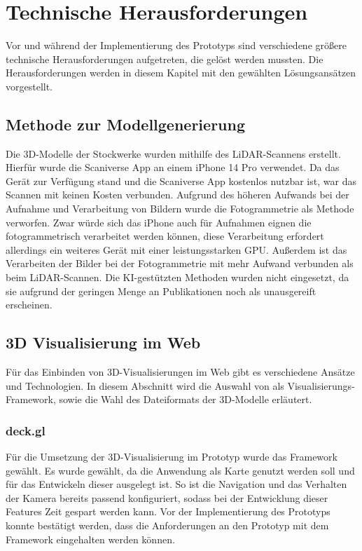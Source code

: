 \newpage
\section{Technische Herausforderungen}
Vor und während der Implementierung des Prototyps sind verschiedene größere technische Herausforderungen aufgetreten, die gelöst werden mussten. Die Herausforderungen werden in diesem Kapitel mit den gewählten Lösungsansätzen vorgestellt. 

\subsection{Methode zur Modellgenerierung}
Die 3D-Modelle der Stockwerke wurden mithilfe des LiDAR-Scannens erstellt. Hierfür wurde die Scaniverse App an einem iPhone 14 Pro verwendet. Da das Gerät zur Verfügung stand und die Scaniverse App kostenlos nutzbar ist, war das Scannen mit keinen Kosten verbunden. Aufgrund des höheren Aufwands bei der Aufnahme und Verarbeitung von Bildern wurde die Fotogrammetrie als Methode verworfen. Zwar würde sich das iPhone auch für Aufnahmen eignen die fotogrammetrisch verarbeitet werden können, diese Verarbeitung erfordert allerdings ein weiteres Gerät mit einer leistungsstarken \ac{GPU}. Außerdem ist das Verarbeiten der Bilder bei der Fotogrammetrie mit mehr Aufwand verbunden als beim \ac{LiDAR}-Scannen. Die \ac{KI}-gestützten Methoden wurden nicht eingesetzt, da sie aufgrund der geringen Menge an Publikationen noch als unausgereift erscheinen.

\subsection{3D Visualisierung im Web}
Für das Einbinden von 3D-Visualisierungen im Web gibt es verschiedene Ansätze und Technologien. In diesem Abschnitt wird die Auswahl von \deckgl{} als Visualisierungs-Framework, sowie die Wahl des Dateiformats der 3D-Modelle erläutert.

\subsubsection{deck.gl}
Für die Umsetzung der 3D-Visualisierung im Prototyp wurde das Framework \deckgl{} gewählt. Es wurde gewählt, da die Anwendung als Karte genutzt werden soll und \deckgl{} für das Entwickeln dieser ausgelegt ist. So ist die Navigation und das Verhalten der Kamera bereits passend konfiguriert, sodass bei der Entwicklung dieser Features Zeit gespart werden kann. Vor der Implementierung des Prototyps konnte bestätigt werden, dass die Anforderungen an den Prototyp mit dem Framework eingehalten werden können.

